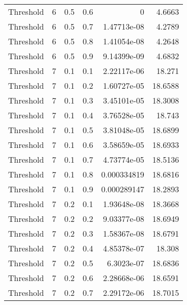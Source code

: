 \documentclass{article}
\begin{document}
\begin{longtable}[H]{lrrrrr}
 Threshold      &       6 &   0.5 &            0.6 &      0           &          4.6663 \\
 Threshold      &       6 &   0.5 &            0.7 &      1.47713e-08 &          4.2789 \\
 Threshold      &       6 &   0.5 &            0.8 &      1.41054e-08 &          4.2648 \\
 Threshold      &       6 &   0.5 &            0.9 &      9.14399e-09 &          4.6832 \\
 Threshold      &       7 &   0.1 &            0.1 &      2.22117e-06 &         18.271  \\
 Threshold      &       7 &   0.1 &            0.2 &      1.60727e-05 &         18.6588 \\
 Threshold      &       7 &   0.1 &            0.3 &      3.45101e-05 &         18.3008 \\
 Threshold      &       7 &   0.1 &            0.4 &      3.76528e-05 &         18.743  \\
 Threshold      &       7 &   0.1 &            0.5 &      3.81048e-05 &         18.6899 \\
 Threshold      &       7 &   0.1 &            0.6 &      3.58659e-05 &         18.6933 \\
 Threshold      &       7 &   0.1 &            0.7 &      4.73774e-05 &         18.5136 \\
 Threshold      &       7 &   0.1 &            0.8 &      0.000334819 &         18.6816 \\
 Threshold      &       7 &   0.1 &            0.9 &      0.000289147 &         18.2893 \\
 Threshold      &       7 &   0.2 &            0.1 &      1.93648e-08 &         18.3668 \\
 Threshold      &       7 &   0.2 &            0.2 &      9.03377e-08 &         18.6949 \\
 Threshold      &       7 &   0.2 &            0.3 &      1.58367e-08 &         18.6791 \\
 Threshold      &       7 &   0.2 &            0.4 &      4.85378e-07 &         18.308  \\
 Threshold      &       7 &   0.2 &            0.5 &      6.3023e-07  &         18.6836 \\
 Threshold      &       7 &   0.2 &            0.6 &      2.28668e-06 &         18.6591 \\
 Threshold      &       7 &   0.2 &            0.7 &      2.29172e-06 &         18.7015 \\

\end{longtable}
\end{document}
